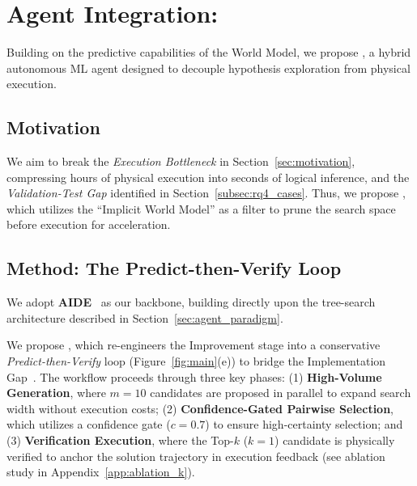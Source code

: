 

\section{Agent Integration: \ours}
\label{sec:agent}

Building on the predictive capabilities of the World Model, we propose \textbf{\ours}, a hybrid autonomous ML agent designed to decouple hypothesis exploration from physical execution. 


\subsection{Motivation}
\label{sec:agent_motivation}

We aim to break the \textit{Execution Bottleneck} in Section~\ref{sec:motivation}, compressing hours of physical execution into seconds of logical inference, and the \textit{Validation-Test Gap} identified in Section~\ref{subsec:rq4_cases}.
Thus, we propose \textbf{\ours}, which utilizes the ``Implicit World Model'' as a filter to prune the search space before execution for acceleration.


\subsection{Method: The Predict-then-Verify Loop}
\label{sec:method}

We adopt \textbf{AIDE}~\cite{jiang2025aideaidrivenexplorationspace} as our backbone, building directly upon the tree-search architecture described in Section~\ref{sec:agent_paradigm}.

We propose \textbf{\ours}, which re-engineers the Improvement stage into a conservative \textit{Predict-then-Verify} loop (Figure~\ref{fig:main}(e)) to bridge the Implementation Gap~\cite{zhu2025aiscientistsfailstrong}.
The workflow proceeds through three key phases: (1) \textbf{High-Volume Generation}, where $m=10$ candidates are proposed in parallel to expand search width without execution costs; (2) \textbf{Confidence-Gated Pairwise Selection}, which utilizes a confidence gate ($c=0.7$) to ensure high-certainty selection; and (3) \textbf{Verification Execution}, where the Top-$k$ ($k=1$) candidate is physically verified to anchor the solution trajectory in execution feedback (see ablation study in Appendix~\ref{app:ablation_k}).

